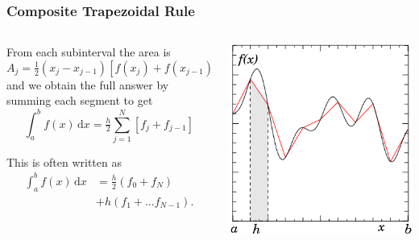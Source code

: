 \documentclass{beamer}
\begin{document}
 \begin{frame}
   \frametitle{Composite Trapezoidal Rule}


   \begin{columns}
      \begin{column}{0.5\textwidth}
        \begin{overlayarea}{\textwidth}{0.7\textheight}
          {
            From each subinterval the area is
            \begin{equation*}
              A_j = \tfrac{1}{2} (x_j - x_{j-1}) \left[ f(x_j) + f(x_{j-1})
              \right]
            \end{equation*}
            and we obtain the full answer by summing each segment to get
            \begin{equation*}
              \int_a^b f(x)\, \text{d}x = \tfrac{h}{2} \sum_{j=1}^N
              \left[ f_j + f_{j-1} \right]
            \end{equation*}
          }
          {

            This is often written as
            \begin{align*}
              \int_a^b f(x)\, \text{d}x& = \tfrac{h}{2} \left(f_0 +
                f_N\right) \\&+ h \left(f_1 + \dots f_{N-1} \right).
            \end{align*}
          }
        \end{overlayarea}
      \end{column}
     \begin{column}{0.5\textwidth}
       \begin{center}
         \includegraphics[width=\textwidth]{figures/trapez2}
       \end{center}
     \end{column}
   \end{columns}

 \end{frame}
\end{document}
